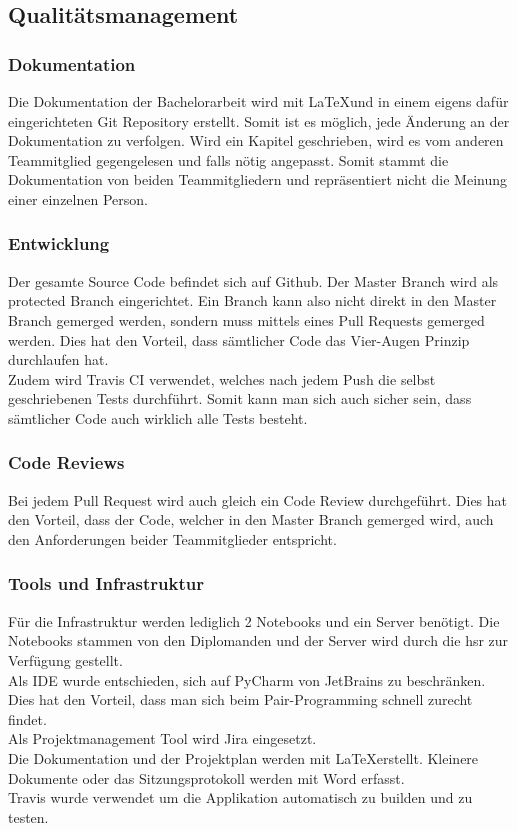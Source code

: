 \subsection{Qualitätsmanagement}

\subsubsection*{Dokumentation}
Die Dokumentation der Bachelorarbeit wird mit \LaTeX und in einem eigens dafür eingerichteten Git Repository erstellt. Somit ist es möglich, jede Änderung an der Dokumentation zu verfolgen. Wird ein Kapitel geschrieben, wird es vom anderen Teammitglied gegengelesen und falls nötig angepasst. Somit stammt die Dokumentation von beiden Teammitgliedern und repräsentiert nicht die Meinung einer einzelnen Person. 


\subsubsection*{Entwicklung}
Der gesamte Source Code befindet sich auf Github. Der Master Branch wird als protected Branch eingerichtet. Ein Branch kann also nicht direkt in den Master Branch gemerged werden, sondern muss mittels eines Pull Requests gemerged werden. Dies hat den Vorteil, dass sämtlicher Code das Vier-Augen Prinzip durchlaufen hat. \\ 
Zudem wird Travis CI verwendet, welches nach jedem Push die selbst geschriebenen Tests durchführt. Somit kann man sich auch sicher sein, dass sämtlicher Code auch wirklich alle Tests besteht.

\subsubsection*{Code Reviews}
Bei jedem Pull Request wird auch gleich ein Code Review durchgeführt. Dies hat den Vorteil, dass der Code, welcher in den Master Branch gemerged wird, auch den Anforderungen beider Teammitglieder entspricht.

\subsubsection*{Tools und Infrastruktur}
Für die Infrastruktur werden lediglich 2 Notebooks und ein Server benötigt. Die Notebooks stammen von den Diplomanden und der Server wird durch die \gls{hsr} zur Verfügung gestellt. \\
Als IDE wurde entschieden, sich auf PyCharm von JetBrains zu beschränken. Dies hat den Vorteil, dass man sich beim Pair-Programming schnell zurecht findet. \\
Als Projektmanagement Tool wird Jira eingesetzt. \\
Die Dokumentation und der Projektplan werden mit \LaTeX erstellt. Kleinere Dokumente oder das Sitzungsprotokoll werden mit Word erfasst. \\
Travis wurde verwendet um die Applikation automatisch zu builden und zu testen.

